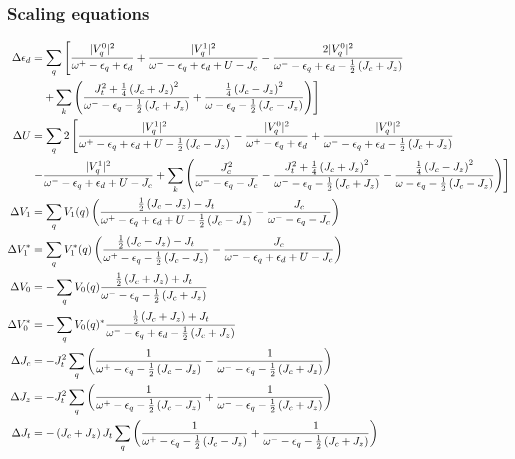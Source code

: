 \documentclass[14pt]{extarticle}
\numberwithin{equation}{section}
\begin{document}
{\subsubsection{Scaling equations}
\begin{align*}
	\Delta \epsilon_d &= \sum_q \left[\frac{|V_q^0|^2}{\omega^+ - \epsilon_q + \epsilon_d } + \frac{|V_q^1|^2}{\omega^- - \epsilon_q + \epsilon_d  + U - J_c} - \frac{2|V_q^0|^2}{\omega^- - \epsilon_q + \epsilon_d - \frac{1}{2}\left({J_c + J_z}\right)} \right.\\
			  &\quad\left.+ \sum_{k}\left({\frac{J_t^2 + \frac{1}{4}\left({J_c + J_z}\right)^2}{\omega^- - \epsilon_q - \frac{1}{2} \left({J_c + J_z}\right)} + \frac{\frac{1}{4}\left({J_c - J_z}\right)^2}{\omega - \epsilon_q - \frac{1}{2}\left({J_c - J_z}\right)}}\right)\right]\\
	\Delta U &= \sum_q 2\left[\frac{|V_q^1|^2}{\omega^+ - \epsilon_q + \epsilon_d + U - \frac{1}{2} \left({J_c -J_z}\right)} - \frac{|V_q^0|^2}{\omega^+ - \epsilon_q + \epsilon_d} + \frac{|V_q^0|^2}{\omega^- - \epsilon_q + \epsilon_d  - \frac{1}{2} \left({J_c + J_z}\right)} \right.\\
		 &\left. - \frac{|V_q^1|^2}{\omega^- - \epsilon_q + \epsilon_d + U - J_c} + \sum_{k}\left({\frac{J_c^2}{\omega^- - \epsilon_q - J_c} - \frac{J_t^2 + \frac{1}{4}\left({J_c + J_z}\right)^2}{\omega^- - \epsilon_q - \frac{1}{2} \left({J_c + J_z}\right)} - \frac{\frac{1}{4}\left({J_c - J_z}\right)^2}{\omega - \epsilon_q - \frac{1}{2}\left({J_c - J_z}\right)}}\right)\right]\\
\Delta V_1 &= \sum_q V_1(q)\left({\frac{\frac{1}{2}\left({J_c - J_z}\right) - J_t}{\omega^+ - \epsilon_q +\epsilon_d + U - \frac{1}{2} \left({J_c - J_z}\right)} - \frac{J_c}{\omega^- - \epsilon_q - J_c}}\right)\\
\Delta V_1^* &= \sum_q V_1^*(q)\left({\frac{\frac{1}{2}\left({J_c - J_z}\right) - J_t}{\omega^+ - \epsilon_q - \frac{1}{2} \left({J_c - J_z}\right)} - \frac{J_c}{\omega^- - \epsilon_q + \epsilon_d + U - J_c}}\right)\\
\Delta V_0 &= -\sum_q V_0(q)\frac{\frac{1}{2}\left({J_c + J_z}\right) + J_t}{\omega^- - \epsilon_q  - \frac{1}{2} \left({J_c + J_z}\right)}\\
\Delta V_0^* &= -\sum_q V_0(q)^*\frac{\frac{1}{2}\left({J_c + J_z}\right) + J_t}{\omega^- - \epsilon_q + \epsilon_d - \frac{1}{2} \left({J_c + J_z}\right)}\\
\Delta J_c &= -J_t^2 \sum_q \left({\frac{1}{\omega^+ - \epsilon_q  - \frac{1}{2} \left({J_c - J_z}\right)} - \frac{1}{\omega^- - \epsilon_q  - \frac{1}{2} \left({J_c + J_z}\right)}}\right)\\
\Delta J_z &= -J_t^2 \sum_q \left({\frac{1}{\omega^+ - \epsilon_q  - \frac{1}{2} \left({J_c - J_z}\right)} + \frac{1}{\omega^- - \epsilon_q  - \frac{1}{2} \left({J_c + J_z}\right)}}\right)\\
\Delta J_t &= - \left({J_c + J_z}\right) J_t \sum_q \left({\frac{1}{\omega^+ - \epsilon_q  - \frac{1}{2} \left({J_c - J_z}\right)} + \frac{1}{\omega^- - \epsilon_q  - \frac{1}{2} \left({J_c + J_z}\right)}}\right)
\end{align*}
}
\end{document}
